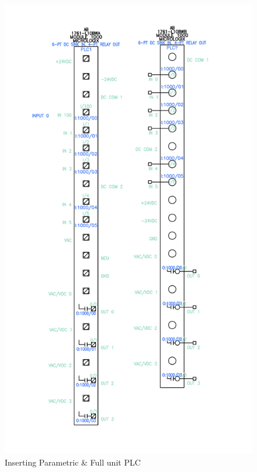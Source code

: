 \documentclass[12pt]{article}
\begin{document}
\begin{figure}[H]
    \centering
    \includegraphics[width=.8\textwidth]{1.png}
    \caption{Inserting Parametric \& Full unit PLC}
    \label{fig:insert}
\end{figure}
\end{document}

